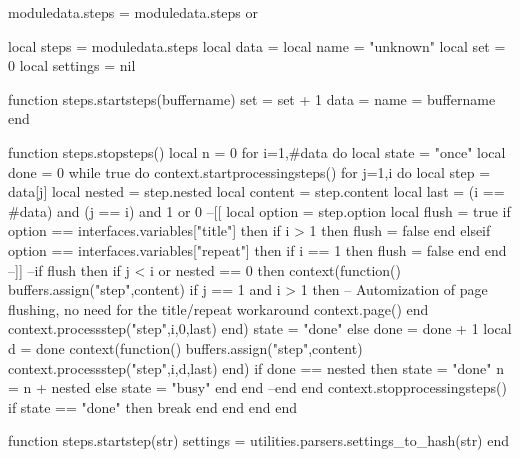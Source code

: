 


\unprotect

\startluacode

moduledata.steps = moduledata.steps or { }

local steps      = moduledata.steps
local data       = { }
local name       = "unknown"
local set        = 0
local settings   = nil

function steps.startsteps(buffername)
	set  = set + 1
	data = { }
	name = buffername
end

function steps.stopsteps()
	local n = 0
	for i=1,#data do
	local state = "once"
	local done  = 0
	while true do
		context.startprocessingsteps()
		for j=1,i do
			local step    = data[j]
			local nested  = step.nested
			local content = step.content
			local last    = (i == #data) and (j == i) and 1 or 0
			--[[
			local option = step.option
			local flush  = true
			if option == interfaces.variables["title"] then
				if i > 1 then
				flush = false
				end
			elseif option == interfaces.variables["repeat"] then
				if i == 1 then
				flush = false
				end
			end 
			--]]
			--if flush then
			if j < i or nested == 0 then
				context(function()
					buffers.assign("step",content)
					if j == 1 and i > 1 then -- Automization of page flushing, no need for the title/repeat workaround
					context.page()
					end
					context.processstep("step",i,0,last)
				end)
				state = "done"
				else
					done = done + 1
					local d = done
					context(function()
						buffers.assign("step",content)
						context.processstep("step",i,d,last)
					end)
				if done == nested then
					state = "done"
					n = n + nested
				else
					state = "busy"
				end
				end
				--end
			end
			context.stopprocessingsteps()
			if state == "done" then
				break
			end
		end
	end
end

function steps.startstep(str)
	settings = utilities.parsers.settings_to_hash(str)
end

